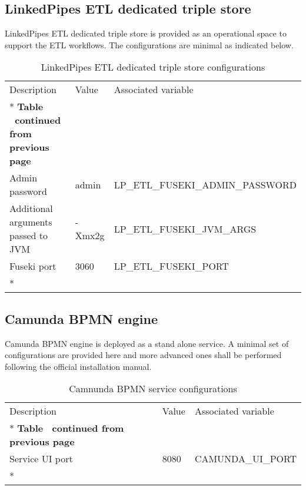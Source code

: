 	\subsection{LinkedPipes ETL dedicated triple store}
	
	LinkedPipes ETL dedicated triple store is provided as an operational space to support the ETL workflows. The configurations are minimal as indicated below. 
	
	\begin{longtable}[c]{@{}p{4cm}p{2cm}l@{}}
		\toprule
		Description & Value & Associated variable \\* \midrule
		\endfirsthead
		\multicolumn{3}{c}%
		{{\bfseries Table \thetable\ continued from previous page}} \\
		\endhead
		\bottomrule
		\endfoot
		\endlastfoot
		Admin password & admin & LP\_ETL\_FUSEKI\_ADMIN\_PASSWORD \\
		Additional arguments passed to JVM & -Xmx2g & LP\_ETL\_FUSEKI\_JVM\_ARGS \\
		Fuseki port & 3060 & LP\_ETL\_FUSEKI\_PORT \\* \bottomrule
		\caption{LinkedPipes ETL dedicated triple store configurations}
		\label{tab:my-table6}\\
	\end{longtable}
	
	\subsection{Camunda BPMN engine}

	Camunda BPMN engine is deployed as a stand alone service.  A minimal set of configurations are provided here and more advanced ones shall be performed following the official installation manual. 
	
 	\begin{longtable}[c]{@{}p{4cm}p{2cm}l@{}}
	 	\toprule
	 	Description & Value & Associated variable \\* \midrule
	 	\endfirsthead
	 	\multicolumn{3}{c}%
	 	{{\bfseries Table \thetable\ continued from previous page}} \\
	 	\endhead
	 	\bottomrule
	 	\endfoot
	 	\endlastfoot
	 	Service UI port & 8080 & CAMUNDA\_UI\_PORT \\* \bottomrule
	 	\caption{Camnunda BPMN service configurations}
	 	\label{tab:my-table9}\\
	 \end{longtable}
	
	